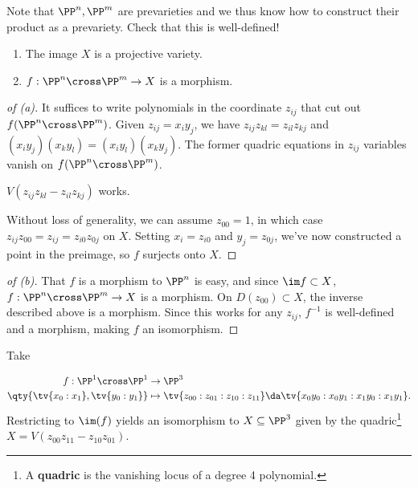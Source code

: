 Note that \(\PP^n, \PP^m\) are prevarieties and we thus know how to
construct their product as a prevariety. Check that this is
well-defined!

\begin{proposition}

\envlist

\begin{enumerate}
\def\labelenumi{\alph{enumi}.}
\item
  The image \(X\) is a projective variety.
\item
  \(f: \PP^n \cross \PP^m \to X\) is a morphism.
\end{enumerate}

\end{proposition}

\begin{proof}[of (a)]

It suffices to write polynomials in the coordinate \(z_{ij}\) that cut
out \(f(\PP^n \cross \PP^m)\). Given \(z_{ij} = x_i y_j\), we have
\(z_{ij} z_{kl} = z_{il} z_{kj}\) and
\((x_i y_j)(x_k y_l) = (x_i y_l)(x_k y_j)\). The former quadric
equations in \(z_{ij}\) variables vanish on \(f(\PP^n \cross \PP^m)\).

\begin{claim}

\(V(z_{ij} z_{kl} - z_{il} z_{kj})\) works.

\end{claim}

Without loss of generality, we can assume \(z_{00} = 1\), in which case
\(z_{ij} z_{00} = z_{ij} = z_{i0} z_{0j}\) on \(X\). Setting
\(x_i = z_{i0}\) and \(y_j = z_{0j}\), we've now constructed a point in
the preimage, so \(f\) surjects onto \(X\).

\end{proof}

\begin{proof}[of (b)]

That \(f\) is a morphism to \(\PP^n\) is easy, and since
\(\im f \subset X\), \(f: \PP^n \cross \PP^m \to X\) is a morphism. On
\(D(z_{00}) \subset X\), the inverse described above is a morphism.
Since this works for any \(z_{ij}\), \(f^{-1}\) is well-defined and a
morphism, making \(f\) an isomorphism.

\end{proof}

\begin{example}

Take

\begin{align*}  
f: \PP^1 \cross \PP^1 &\to \PP^3 \\
\qty{ \tv{x_0: x_1}, \tv{y_0: y_1}} &\mapsto \tv{z_{00} : z_{01} : z_{10} : z_{11} } \da \tv{x_0 y_0: x_0 y_1 : x_1 y_0 : x_1 y_1}
.\end{align*} Restricting to \(\im(f)\) yields an isomorphism to
\(X \subseteq \PP^3\) given by the quadric\footnote{A \textbf{quadric}
  is the vanishing locus of a degree 4 polynomial.}
\(X = V(z_{00} z_{11} - z_{10} z_{01} )\).

\end{example}

